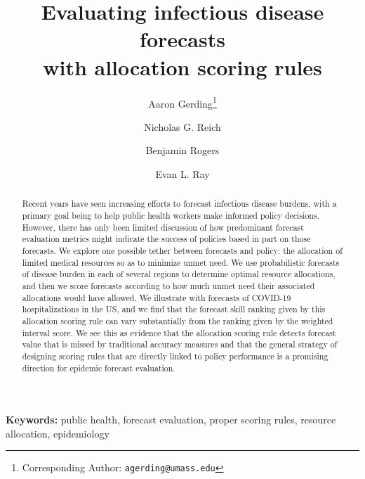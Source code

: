 \documentclass{article}
\author{Aaron Gerding\thanks{Corresponding Author: \texttt{agerding@umass.edu}}}
\author{Nicholas G. Reich}
\author{Benjamin Rogers}
\author{Evan L. Ray}
\affil{Department of Biostatistics and Epidemiology, School of Public Health and Health
Sciences, University of Massachusetts at Amherst}
\title{Evaluating infectious disease forecasts \\ with allocation scoring rules}
\begin{document}


\newcommand{\del}[2]{\frac{\partial {#1} }{\partial {#2}} }
\newcommand{\dby}[2]{\frac{d {#1} }{d {#2}} }
\newcommand{\sbar}{\overline{s}}
\newtheorem{proposition}{Proposition}

\theoremstyle{remark}
\newtheorem*{remark}{Remark}

\maketitle




\begin{Schunk}
\end{Schunk}

\begin{abstract}
Recent years have seen increasing efforts to forecast infectious disease burdens, with a primary goal being to help
public health workers make informed policy decisions. However, there has only been limited discussion of how
predominant forecast evaluation metrics might indicate the success of policies based in part on those forecasts. We
explore one possible tether between forecasts and policy: the allocation of limited medical resources so as to minimize
unmet need. We use probabilistic forecasts of disease burden in each of several regions to determine optimal resource
allocations, and then we score forecasts according to how much unmet need their associated allocations would have
allowed. We illustrate with forecasts of COVID-19 hospitalizations in the US, and we find that the forecast skill
ranking given by this allocation scoring rule can vary substantially from the ranking given by the weighted interval
score. We see this as evidence that the allocation scoring rule detects forecast value that is missed by traditional
accuracy measures and that the general strategy of designing scoring rules that are directly linked to policy
performance is a promising direction for epidemic forecast evaluation.
\end{abstract}

\noindent \textbf{Keywords:} public health, forecast evaluation, proper scoring rules, resource allocation, epidemiology
\end{document}
